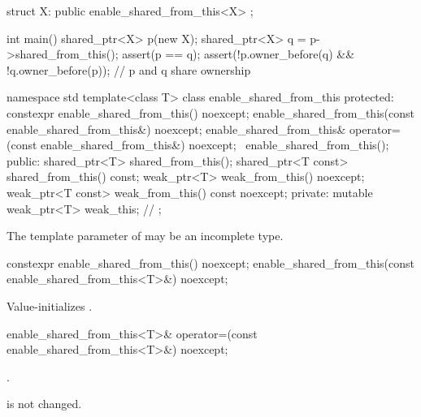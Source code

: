 \pnum
\begin{example}
\begin{codeblock}
struct X: public enable_shared_from_this<X> { };

int main() {
  shared_ptr<X> p(new X);
  shared_ptr<X> q = p->shared_from_this();
  assert(p == q);
  assert(!p.owner_before(q) && !q.owner_before(p)); // p and q share ownership
}
\end{codeblock}
\end{example}

\begin{codeblock}
namespace std {
  template<class T> class enable_shared_from_this {
  protected:
    constexpr enable_shared_from_this() noexcept;
    enable_shared_from_this(const enable_shared_from_this&) noexcept;
    enable_shared_from_this& operator=(const enable_shared_from_this&) noexcept;
    ~enable_shared_from_this();
  public:
    shared_ptr<T> shared_from_this();
    shared_ptr<T const> shared_from_this() const;
    weak_ptr<T> weak_from_this() noexcept;
    weak_ptr<T const> weak_from_this() const noexcept;
  private:
    mutable weak_ptr<T> weak_this; // \expos
  };
}
\end{codeblock}

\pnum
The template parameter  of 
may be an incomplete type.

%
\begin{itemdecl}
constexpr enable_shared_from_this() noexcept;
enable_shared_from_this(const enable_shared_from_this<T>&) noexcept;
\end{itemdecl}

\begin{itemdescr}
\pnum\effects  Value-initializes .
\end{itemdescr}

%
\begin{itemdecl}
enable_shared_from_this<T>& operator=(const enable_shared_from_this<T>&) noexcept;
\end{itemdecl}

\begin{itemdescr}
\pnum\returns  {}.

\pnum\begin{note}  is not changed. \end{note}
\end{itemdescr}

